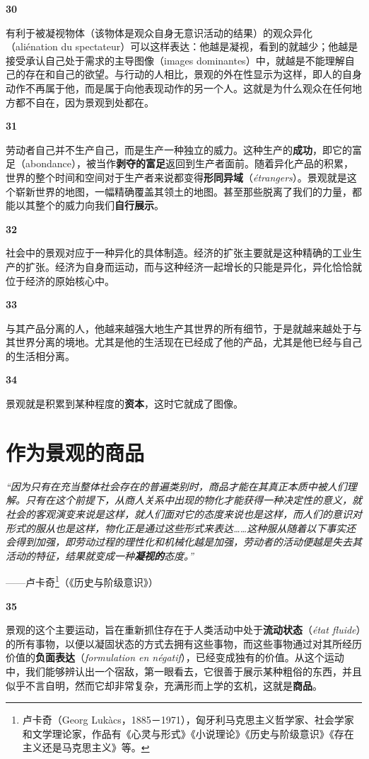 \documentclass[fontset=fandol, a4paper, 12pt, openright]{ctexbook}
\makeatletter
\renewenvironment{quote}
  {\list{}{\rightmargin\leftmargin}%
   \item\relax\small\itshape\color{darkgray}}
  {\endlist}
\newcommand{\thesis}[1]{%
    \par\vspace{1.5em}%
    {\centering \textbf{\Large #1}\par}%
    \nobreak\vspace{0.5em}\nobreak
    \@afterindenttrue %
    \@afterheading    %
}
\makeatother
\begin{document}
\thesis{30}
有利于被凝视物体（该物体是观众自身无意识活动的结果）的观众异化（aliénation du spectateur）可以这样表达：他越是凝视，看到的就越少；他越是接受承认自己处于需求的主导图像（images dominantes）中，就越是不能理解自己的存在和自己的欲望。与行动的人相比，景观的外在性显示为这样，即人的自身动作不再属于他，而是属于向他表现动作的另一个人。这就是为什么观众在任何地方都不自在，因为景观到处都在。

\thesis{31}
劳动者自己并不生产自己，而是生产一种独立的威力。这种生产的\textbf{成功}，即它的富足（abondance），被当作\textbf{剥夺的富足}返回到生产者面前。随着异化产品的积累，世界的整个时间和空间对于生产者来说都变得\textbf{形同异域}（\textit{étrangers}）。景观就是这个崭新世界的地图，一幅精确覆盖其领土的地图。甚至那些脱离了我们的力量，都能以其整个的威力向我们\textbf{自行展示}。

\thesis{32}
社会中的景观对应于一种异化的具体制造。经济的扩张主要就是这种精确的工业生产的扩张。经济为自身而运动，而与这种经济一起增长的只能是异化，异化恰恰就位于经济的原始核心中。

\thesis{33}
与其产品分离的人，他越来越强大地生产其世界的所有细节，于是就越来越处于与其世界分离的境地。尤其是他的生活现在已经成了他的产品，尤其是他已经与自己的生活相分离。

\thesis{34}
景观就是积累到某种程度的\textbf{资本}，这时它就成了图像。

\chapter{作为景观的商品}

\begin{quote}
“因为只有在充当整体社会存在的普遍类别时，商品才能在其真正本质中被人们理解。只有在这个前提下，从商人关系中出现的物化才能获得一种决定性的意义，就社会的客观演变来说是这样，就人们面对它的态度来说也是这样，而人们的意识对形式的服从也是这样，物化正是通过这些形式来表达……这种服从随着以下事实还会得到加强，即劳动过程的理性化和机械化越是加强，劳动者的活动便越是失去其活动的特征，结果就变成一种\textbf{凝视的}态度。”

\begin{flushright}
——卢卡奇\footnote{卢卡奇（Georg Lukàcs，1885－1971），匈牙利马克思主义哲学家、社会学家和文学理论家，作品有《心灵与形式》《小说理论》《历史与阶级意识》《存在主义还是马克思主义》等。}（《历史与阶级意识》）
\end{flushright}
\end{quote}

\thesis{35}
景观的这个主要运动，旨在重新抓住存在于人类活动中处于\textbf{流动状态}（\textit{état fluide}）的所有事物，以便以凝固状态的方式去拥有这些事物，而这些事物通过对其所经历价值的\textbf{负面表达}（\textit{formulation en négatif}），已经变成独有的价值。从这个运动中，我们能够辨认出一个宿敌，第一眼看去，它很善于展示某种粗俗的东西，并且似乎不言自明，然而它却非常复杂，充满形而上学的玄机，这就是\textbf{商品}。
\end{document}
